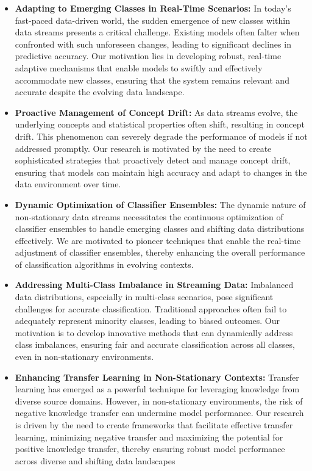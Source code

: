 \begin{itemize}
    \item \textbf{Adapting to Emerging Classes in Real-Time Scenarios:} In today's fast-paced data-driven world, the sudden emergence of new classes within data streams presents a critical challenge. Existing models often falter when confronted with such unforeseen changes, leading to significant declines in predictive accuracy. Our motivation lies in developing robust, real-time adaptive mechanisms that enable models to swiftly and effectively accommodate new classes, ensuring that the system remains relevant and accurate despite the evolving data landscape.
    \item \textbf{Proactive Management of Concept Drift:} As data streams evolve, the underlying concepts and statistical properties often shift, resulting in concept drift. This phenomenon can severely degrade the performance of models if not addressed promptly. Our research is motivated by the need to create sophisticated strategies that proactively detect and manage concept drift, ensuring that models can maintain high accuracy and adapt to changes in the data environment over time.
    \item \textbf{Dynamic Optimization of Classifier Ensembles:} The dynamic nature of non-stationary data streams necessitates the continuous optimization of classifier ensembles to handle emerging classes and shifting data distributions effectively. We are motivated to pioneer techniques that enable the real-time adjustment of classifier ensembles, thereby enhancing the overall performance of classification algorithms in evolving contexts.
    \item\textbf{Addressing Multi-Class Imbalance in Streaming Data:} Imbalanced data distributions, especially in multi-class scenarios, pose significant challenges for accurate classification. Traditional approaches often fail to adequately represent minority classes, leading to biased outcomes. Our motivation is to develop innovative methods that can dynamically address class imbalances, ensuring fair and accurate classification across all classes, even in non-stationary environments.
    \item \textbf{Enhancing Transfer Learning in Non-Stationary Contexts:} Transfer learning has emerged as a powerful technique for leveraging knowledge from diverse source domains. However, in non-stationary environments, the risk of negative knowledge transfer can undermine model performance. Our research is driven by the need to create frameworks that facilitate effective transfer learning, minimizing negative transfer and maximizing the potential for positive knowledge transfer, thereby ensuring robust model performance across diverse and shifting data landscapes
\end{itemize}

